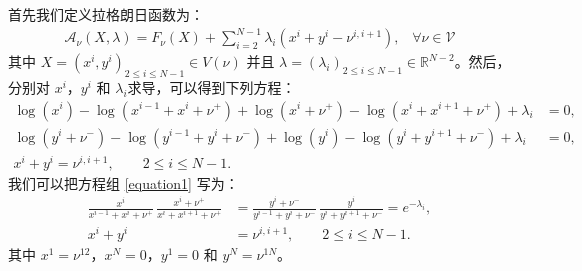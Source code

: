 首先我们定义拉格朗日函数为：
\begin{align*}
    \mathcal{A}_{\nu}(X,\lambda) = F_{\nu}(X) + \sum_{i=2}^{N-1} \lambda_i \left(x^{i} + y^{i} - \nu^{i,i+1}\right), \;\;\;\forall \nu\in\mathcal{V}
\end{align*}
其中 $X=(x^i,y^i)_{2\le i\le N-1}\in V(\nu)$ 并且 $\lambda=(\lambda_i)_{2\le i\le N-1}\in \mathbb{R}^{N-2}$。然后，分别对 $x^{i}$，$y^{i}$ 和 $\lambda_i$求导，可以得到下列方程：
\begin{equation}\label{equation1}
	\begin{split}
		\log\left(x^{i}\right) - \log\left(x^{i-1}+x^{i}+\nu^{+}\right)  + \log\left(x^{i}+\nu^{+}\right) -\log\left(x^{i}+x^{i+1}+\nu^{+}\right)+\lambda_i  &= 0, \\
		\log\left(y^{i}+\nu^{-}\right) -\log\left(y^{i-1}+y^{i}+\nu^{-}\right)  + \log\left(y^{i}\right) - \log\left(y^{i}+y^{i+1}+\nu^{-}\right) +\lambda_i &= 0, \\
		x^{i} + y^{i} = \nu^{i,i+1},\qquad 2\le i\le N-1.\qquad\qquad\qquad
	\end{split}
\end{equation}
我们可以把方程组 \eqref{equation1} 写为：
\begin{equation}\label{equations}
    \begin{split}
    \frac{x^{i}}{x^{i-1}+x^{i}+\nu^+}
    \,\frac{x^{i}+\nu^+}{x^{i}+x^{i+1}+\nu^+}
    &= \frac{y^{i}+\nu^-}{y^{i-1}+y^{i}+\nu^-}
    \,\frac{y^{i}}{y^{i}+y^{i+1}+\nu^-}=e^{-\lambda_i},\\
    x^{i} + y^{i} &= \nu^{i,i+1},\qquad 2\le i\le N-1.
    \end{split}
\end{equation}
其中 $x^1=\nu^{12}$，$x^N=0$，$y^1=0$ 和 $y^N=\nu^{1N}$。
\\

